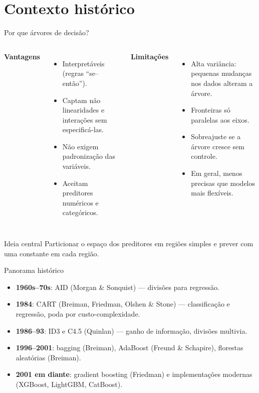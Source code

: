 \documentclass[aspectratio=169]{beamer}
\begin{document}
\section{Contexto histórico}

\begin{frame}{Por que árvores de decisão?}
\begin{columns}[T]
\textbf{Vantagens}
\begin{itemize}
  \item Interpretáveis (regras ``se--então'').
  \item Captam não linearidades e interações sem especificá-las.
  \item Não exigem padronização das variáveis.
  \item Aceitam preditores numéricos e categóricos.
\end{itemize}
\textbf{Limitações}
\begin{itemize}
  \item Alta variância: pequenas mudanças nos dados alteram a árvore.
  \item Fronteiras só paralelas aos eixos.
  \item Sobreajuste se a árvore cresce sem controle.
  \item Em geral, menos precisas que modelos mais flexíveis.
\end{itemize}
\end{columns}
\vfill
\begin{block}{Ideia central}
Particionar o espaço dos preditores em regiões simples e prever com uma constante em cada região.
\end{block}
\end{frame}

\begin{frame}{Panorama histórico}
\begin{itemize}
  \item \textbf{1960s--70s}: AID (Morgan \& Sonquist) --- divisões para regressão.
  \item \textbf{1984}: \alert{CART} (Breiman, Friedman, Olshen \& Stone) --- classificação e regressão, poda por custo-complexidade.
  \item \textbf{1986--93}: ID3 e C4.5 (Quinlan) --- ganho de informação, divisões multivia.
  \item \textbf{1996--2001}: bagging (Breiman), AdaBoost (Freund \& Schapire), florestas aleatórias (Breiman).
  \item \textbf{2001 em diante}: gradient boosting (Friedman) e implementações modernas (XGBoost, LightGBM, CatBoost).
\end{itemize}
\end{frame}
\end{document}

